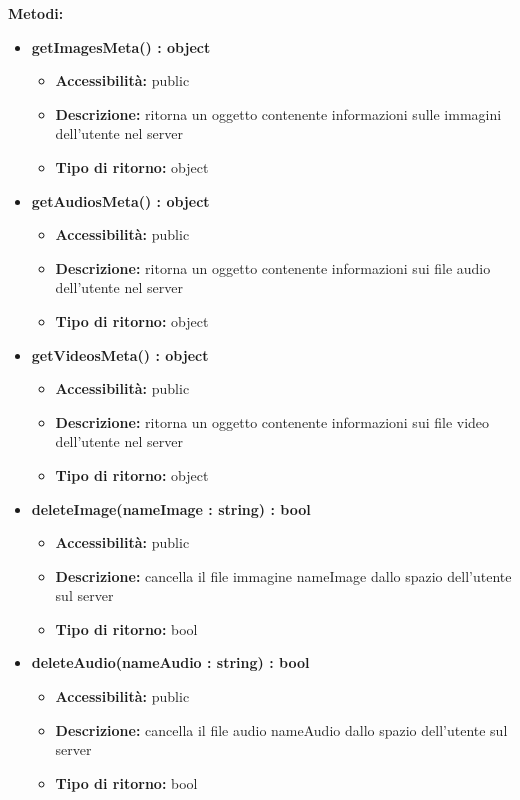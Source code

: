 {		\textbf{Metodi:}
			\begin{itemize}
			\item \textbf{getImagesMeta() : object}
				\begin{itemize}
				\item \textbf{Accessibilit\`{a}:} public
				\item \textbf{Descrizione:} ritorna un oggetto contenente informazioni sulle immagini dell'utente nel server
				\item \textbf{Tipo di ritorno:} object
				\end{itemize}
			\item \textbf{getAudiosMeta() : object}
				\begin{itemize}
				\item \textbf{Accessibilit\`{a}:} public
				\item \textbf{Descrizione:} ritorna un oggetto contenente informazioni sui file audio dell'utente nel server
				\item \textbf{Tipo di ritorno:} object
				\end{itemize}
			\item \textbf{getVideosMeta() : object}
				\begin{itemize}
				\item \textbf{Accessibilit\`{a}:} public
				\item \textbf{Descrizione:} ritorna un oggetto contenente informazioni sui file video dell'utente nel server
				\item \textbf{Tipo di ritorno:} object
				\end{itemize}
			\item \textbf{deleteImage(nameImage : string) : bool}
				\begin{itemize}
				\item \textbf{Accessibilit\`{a}:} public
				\item \textbf{Descrizione:} cancella il file immagine nameImage dallo spazio dell'utente sul server
				\item \textbf{Tipo di ritorno:} bool
				\end{itemize}
			\item \textbf{deleteAudio(nameAudio : string) : bool}
				\begin{itemize}
				\item \textbf{Accessibilit\`{a}:} public
				\item \textbf{Descrizione:} cancella il file audio nameAudio dallo spazio dell'utente sul server
				\item \textbf{Tipo di ritorno:} bool

\end{itemize}
\end{itemize}}
